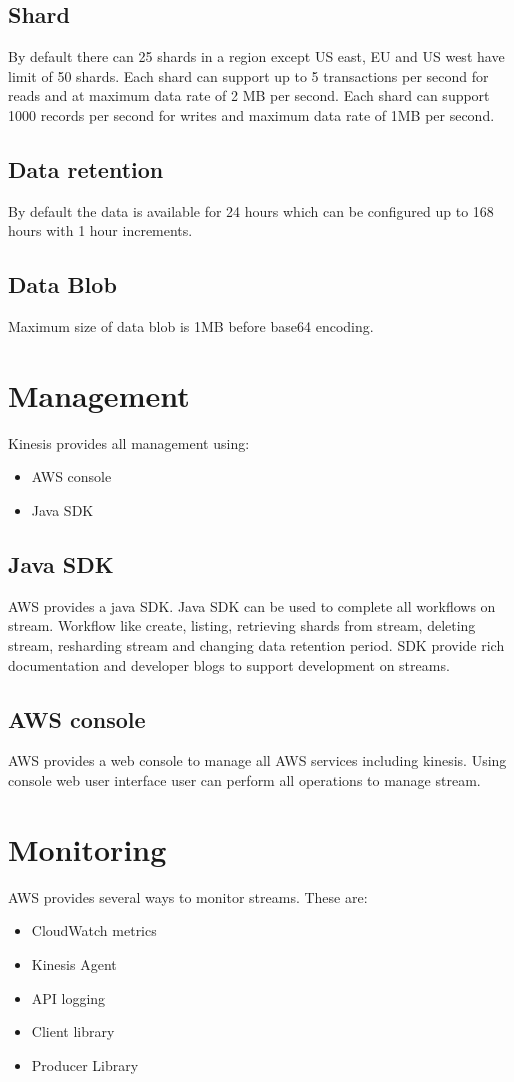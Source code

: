 \documentclass[9pt,twocolumn,twoside]{../../styles/osajnl}
\begin{document}
\subsection{Shard}
By default there can 25 shards in a region except US east, EU and US west have
limit of 50 shards. Each shard can support up to 5 transactions per second for
reads and at maximum data rate of 2 MB per second. Each shard can support 1000
records per second for writes and maximum data rate of 1MB per second.

\subsection{Data retention}
By default the data is available for 24 hours which can be configured up to 168
hours with 1 hour increments.

\subsection{Data Blob}
Maximum size of data blob is 1MB before base64 encoding.

\section{Management}
Kinesis provides all management using:
\begin{itemize}
	\item  AWS console
	\item Java SDK \cite{www-kinesis-javasdk} 
\end{itemize}

\subsection{Java SDK}
AWS provides a java SDK. Java SDK \cite{www-kinesis-javasdk} can be used to
complete all workflows on stream. Workflow like create, listing, retrieving
shards from stream, deleting stream, resharding stream and changing data
retention period. SDK provide rich documentation and developer blogs to support
development on streams.

\subsection{AWS console}
AWS provides a web console to manage all AWS services including kinesis.  Using
console web user interface user can perform all operations to manage stream.

\section{Monitoring}
AWS provides several ways to monitor streams. These are:
\begin{itemize}
	\item CloudWatch metrics
	\item Kinesis Agent 
	\item API logging
	\item Client library
	\item Producer Library 
\end{itemize}
\end{document}
